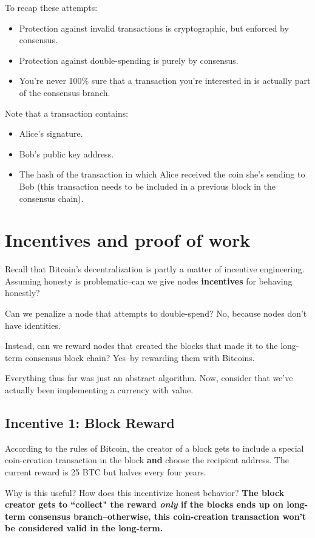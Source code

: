 \documentclass[12pt]{article}
\begin{document}
To recap these attempts:
\begin{itemize}
\item Protection against invalid transactions is cryptographic, but enforced by consensus. \item Protection against double-spending is purely by consensus.
\item You're never 100\% sure that a transaction you're interested in is actually part of the consensus branch.
\end{itemize}

Note that a transaction contains:
\begin{itemize}
\item Alice's signature.
\item Bob's public key address.
\item The hash of the transaction in which Alice received the coin she's sending to Bob (this transaction needs to be included in a previous block in the consensus chain).
\end{itemize}

\section*{Incentives and proof of work}

Recall that Bitcoin's decentralization is partly a matter of incentive engineering. Assuming honesty is problematic--can we give nodes \textbf{incentives} for behaving honestly?

Can we penalize a node that attempts to double-spend? No, because nodes don't have identities.

Instead, can we reward nodes that created the blocks that made it to the long-term consensus block chain? Yes--by rewarding them with Bitcoins.

Everything thus far was just an abstract algorithm. Now, consider that we've actually been implementing a currency with value. 

\subsection*{Incentive 1: Block Reward}

According to the rules of Bitcoin, the creator of a block gets to include a special coin-creation transaction in the block \textbf{and} choose the recipient address. The current reward is 25 BTC but halves every four years.

Why is this useful? How does this incentivize honest behavior? \textbf{The block creator gets to ``collect" the reward \textit{only} if the blocks ends up on long-term consensus branch--otherwise, this coin-creation transaction won't be considered valid in the long-term.}
\end{document}
